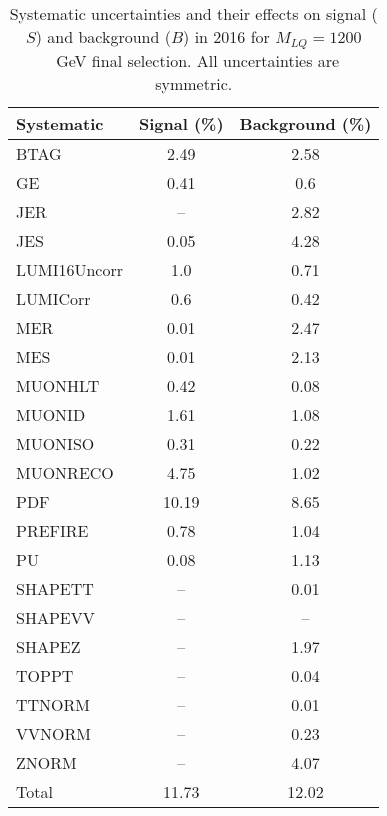 \begin{table}[htbp]
\begin{center}
\caption{Systematic uncertainties and their effects on signal ($S$) and background ($B$) in 2016 for $M_{LQ}=1200$~GeV final selection. All uncertainties are symmetric.}
\begin{tabular}{lcc}
\hline\hline
Systematic & Signal (\%) & Background (\%) \\ \hline 
BTAG & 2.49 & 2.58\\ 
GE & 0.41 & 0.6\\ 
JER & -- & 2.82\\ 
JES & 0.05 & 4.28\\ 
LUMI16Uncorr & 1.0 & 0.71\\ 
LUMICorr & 0.6 & 0.42\\ 
MER & 0.01 & 2.47\\ 
MES & 0.01 & 2.13\\ 
MUONHLT & 0.42 & 0.08\\ 
MUONID & 1.61 & 1.08\\ 
MUONISO & 0.31 & 0.22\\ 
MUONRECO & 4.75 & 1.02\\ 
PDF & 10.19 & 8.65\\ 
PREFIRE & 0.78 & 1.04\\ 
PU & 0.08 & 1.13\\ 
SHAPETT & -- & 0.01\\ 
SHAPEVV & -- & --\\ 
SHAPEZ & -- & 1.97\\ 
TOPPT & -- & 0.04\\ 
TTNORM & -- & 0.01\\ 
VVNORM & -- & 0.23\\ 
ZNORM & -- & 4.07\\ 
Total & 11.73 & 12.02\\ \hline \hline
\end{tabular}
\label{tab:SysUncertainties_uujj_1200}
\end{center}
\end{table}

